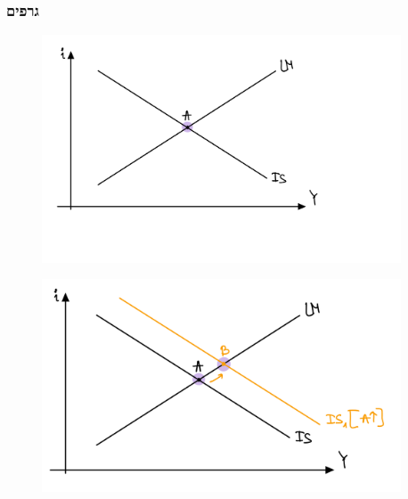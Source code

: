 \documentclass[usenames,dvipsnames]{beamer}
\begin{document}
\begin{RTL}
        \begin{frame}[allowframebreaks]
            \frametitle{גרפים}
        
            \begin{figure}[H]
                    \begin{center}
                        \includegraphics[width=0.95\textwidth]{figures/ISLM default.png}
                    \end{center}
                    \label{fig:}
            \end{figure}
            
            \begin{figure}[H]
                \begin{small}
                    \begin{center}
                        \includegraphics[width=0.95\textwidth]{figures/ISLM IS move.png}
                    \end{center}
                    \label{fig:}
                \end{small}
            \end{figure}
            

\end{frame}
\end{RTL}
\end{document}
